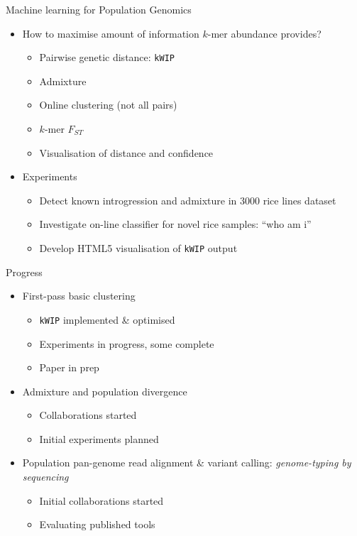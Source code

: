 \documentclass[t]{beamer}
\begin{document}
\begin{frame}{Machine learning for Population Genomics}
  \begin{itemize}
    \item How to maximise amount of information $k$-mer abundance provides?
      \begin{itemize}
        \item Pairwise genetic distance: \texttt{kWIP}
        \item Admixture
        \item Online clustering (not all pairs)
        \item $k$-mer $F_{ST}$
        \item Visualisation of distance and confidence
      \end{itemize}
      \pause
    \item Experiments
      \begin{itemize}
        \item Detect known introgression and admixture in 3000 rice lines
          dataset
        \item Investigate on-line classifier for novel rice samples: ``who am i''
        \item Develop HTML5 visualisation of \texttt{kWIP} output
      \end{itemize}
  \end{itemize}
\end{frame}


\begin{frame}{Progress}
  \begin{itemize}
    \item First-pass basic clustering
      \begin{itemize}
        \item \texttt{kWIP} implemented \& optimised
        \item Experiments in progress, some complete
        \item Paper in prep
      \end{itemize}
      \pause
    \item Admixture and population divergence
      \begin{itemize}
        \item Collaborations started
        \item Initial experiments planned
      \end{itemize}
      \pause
    \item Population pan-genome read alignment \& variant calling:
        \textit{genome-typing by sequencing}
        \begin{itemize}
          \item Initial collaborations started
          \item Evaluating published tools
        \end{itemize}
  \end{itemize}
\end{frame}
\end{document}

